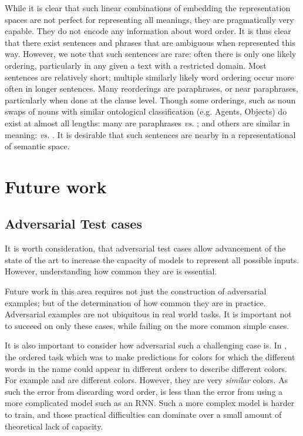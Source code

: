 \documentclass{book}
\begin{document}
While it is clear that such linear combinations of embedding  the representation spaces are not perfect for representing all meanings,
they are pragmatically very capable.
They do not encode any information about word order.
It is thus clear that there exist sentences and phrases that are ambiguous when represented this way.
However, we note that such sentences are rare: often there is only one likely ordering, particularly in any given  a text with a restricted domain.
Most sentences are relatively short; multiple similarly likely word ordering occur more often in longer sentences.
Many reorderings are paraphrases, or near paraphrases, particularly when done at the clause level.
Though some orderings, such as noun swaps of nouns with similar ontological classification (e.g. Agents, Objects) do exist at almost all lengths:
many are paraphrases  \emph{vs.} ;
and others are similar in meaning:  \emph{vs.} .
It is desirable that such sentences are nearby in a representational of semantic space.


\section{Future work}

\subsection{Adversarial Test cases}
It is worth consideration,
that adversarial test cases allow advancement of the state of the art to increase the capacity of models to represent all possible inputs.
However, understanding how common they are is essential.

Future work in this area requires not just the construction of adversarial examples; but of the determination of how common they are in practice.
Adversarial examples are not ubiquitous in real world tasks.
It is important not to succeed on only these cases, while failing on the more common simple cases.

It is also important to consider how adversarial such a challenging case is.
In , the ordered task which was to make predictions for colors for which the different words in the name could appear in different orders to describe different colors.
For example  and  are different colors.
However, they are very \emph{similar} colors.
As such the error from discarding word order, is less than the error from using a more complicated model such as an RNN.
Such a more complex model is harder to train, and those practical difficulties can dominate over a small amount of theoretical lack of capacity.
\end{document}
